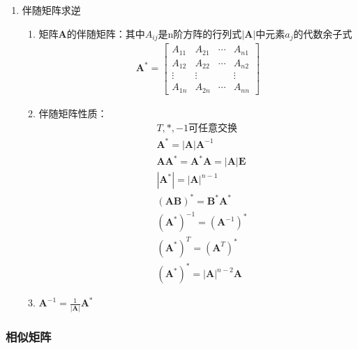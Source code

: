 \documentclass[12pt]{book}
\begin{document}
\begin{enumerate}[1.]
    \item 伴随矩阵求逆
          \begin{enumerate}[(1)]
              \item 矩阵$\bm{A}$的伴随矩阵：其中$A_{ij}$是n阶方阵的行列式$|\bm{A}|$中元素$a_{j}$的代数余子式
                    \begin{gather*}
                        \bm{A}^* = \begin{bmatrix}
                            A_{11} & A_{21} & \cdots & A_{n1} \\
                            A_{12} & A_{22} & \cdots & A_{n2} \\
                            \vdots & \vdots &        & \vdots \\
                            A_{1n} & A_{2n} & \cdots & A_{nn}
                        \end{bmatrix}
                    \end{gather*}
              \item 伴随矩阵性质：
              \begin{align*}
                         & T,*,-1 \text{可任意交换}                           \\
                         & \bm{A}^{*} = |\bm{A}|\bm{A}^{-1}                   \\
                         & \bm{A}\bm{A}^{*} = \bm{A}^{*}\bm{A}=|\bm{A}|\bm{E} \\
                         & |\bm{A}^{*}| = |\bm{A}|^{n-1}                      \\
                         & (\bm{AB})^{*} = \bm{B}^{*}\bm{A}^{*}               \\
                         & (\bm{A}^{*})^{-1} = (\bm{A}^{-1})^{*}              \\
                         & (\bm{A}^{*})^{T} = (\bm{A}^{T})^{*}                \\
                         & (\bm{A}^{*})^{*} = |\bm{A}|^{n-2} \bm{A}
                    \end{align*}
              \item $ \bm{A}^{-1} = \frac{1}{|\bm{A}|}\bm{A}^{*} $
          \end{enumerate}
\end{enumerate}


\subsubsection{相似矩阵}
\end{document}
